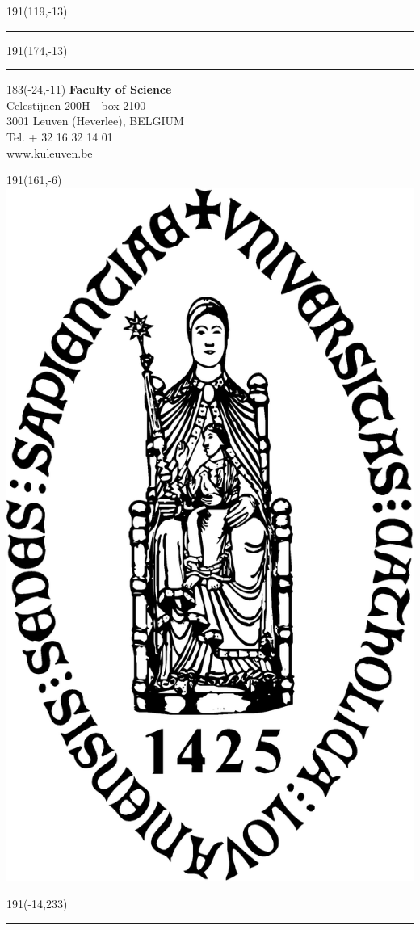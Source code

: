 \newpage
\backmatter
\thispagestyle{empty}
\sffamily
%
\begin{textblock}{191}(119,-13)
{\color{blueline}\rule{160pt}{5.5pt}}
\end{textblock}
%
\begin{textblock}{191}(174,-13)
{\color{blueline}\rule{5.5pt}{59pt}}
\end{textblock}
%
\begin{textblock}{183}(-24,-11)
\textblockcolour{}
\flushright
\fontsize{7}{7.5}\selectfont
\textbf{Faculty of Science}\\
Celestijnen 200H - box 2100\\
3001 Leuven (Heverlee), BELGIUM\\
Tel. + 32 16 32 14 01\\
www.kuleuven.be\\
\end{textblock}
%
\begin{textblock}{191}(161,-6)
\textblockcolour{}
\includegraphics*[height=16.5truemm]{Images/sedes}
\end{textblock}
%
\begin{textblock}{191}(-14,233)
{\color{bluetitle}\rule{544pt}{55pt}}
\end{textblock}
